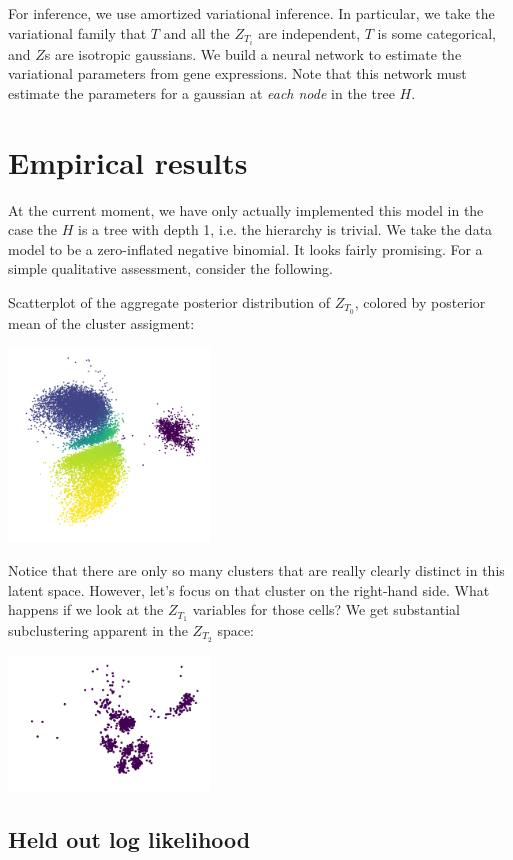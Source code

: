 For inference, we use amortized variational inference.  In particular, we take the variational family that $T$ and all the $Z_{T_i}$ are independent, $T$ is some categorical, and $Z$s are isotropic gaussians.  We build a neural network to estimate the variational parameters from gene expressions.  Note that this network must estimate the parameters for a gaussian at \emph{each node} in the tree $H$.

\section{Empirical results}

At the current moment, we have only actually implemented this model in the case the $H$ is a tree with depth 1, i.e. the hierarchy is trivial.   We take the data model to be a zero-inflated negative binomial.  It looks fairly promising.  For a simple qualitative assessment, consider the following.

Scatterplot of the aggregate posterior distribution of $Z_{T_0}$, colored by posterior mean of the cluster assigment:

\includegraphics[width=0.4\textwidth]{pics/Z1}

Notice that there are only so many clusters that are really clearly distinct in this latent space.  However, let's focus on that cluster on the right-hand side.  What happens if we look at the $Z_{T_1}$ variables for those cells?  We get substantial subclustering apparent in the $Z_{T_2}$ space:

\includegraphics[width=0.4\textwidth]{pics/Z2}

\subsection{Held out log likelihood}

